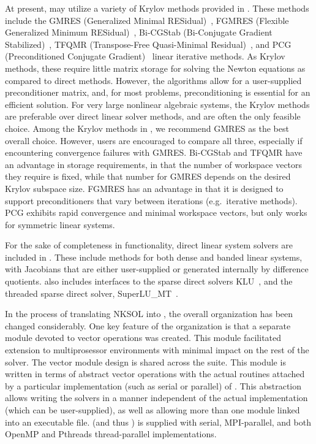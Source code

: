 At present, {\kinsol} may utilize a variety of Krylov methods provided
in {\sundials}. These methods include the
GMRES (Generalized Minimal RESidual)~\cite{SaSc:86},
FGMRES (Flexible Generalized Minimum RESidual)~\cite{Saa:93},
Bi-CGStab (Bi-Conjugate Gradient Stabilized)~\cite{Van:92}, TFQMR
(Transpose-Free Quasi-Minimal Residual)~\cite{Fre:93}, and PCG
(Preconditioned Conjugate Gradient)~\cite{HeSt:52} linear iterative
methods.  As Krylov methods, these require little
matrix storage for solving the Newton equations as compared to direct
methods. However, the algorithms allow for a user-supplied preconditioner
matrix, and, for most problems, preconditioning is essential for an
efficient solution.  For very large nonlinear algebraic systems,
the Krylov methods are preferable over direct linear solver methods,
and are often the only feasible choice. Among the Krylov
methods in {\sundials}, we recommend GMRES as the best overall
choice. However, users are encouraged to compare all three,
especially if encountering convergence failures with GMRES.
Bi-CGStab and TFQMR have an advantage in storage requirements,
in that the number of workspace vectors they require is fixed,
while that number for GMRES depends on the desired Krylov
subspace size.   FGMRES
has an advantage in that it is designed to support preconditioners
that vary between iterations (e.g.~iterative methods).  PCG exhibits
rapid convergence and minimal workspace vectors, but only works for
symmetric linear systems.

For the sake of completeness in functionality, direct linear
system solvers are included in {\kinsol}.  These include methods
for both dense and banded linear systems, with Jacobians that
are either user-supplied or generated internally by difference
quotients.  {\kinsol} also includes interfaces to the sparse
direct solvers KLU~\cite{DaPa:10,KLU_site},
and the threaded sparse direct solver,
SuperLU\_MT~\cite{Li:05,DGL:99,SuperLUMT_site}.

In the process of translating NKSOL into {\CC}, the overall
{\kinsol} organization has been changed considerably. One key
feature of the {\kinsol} organization is that a separate module
devoted to vector operations was created.  This module
facilitated extension to multiprosessor environments with minimal
impact on the rest of the solver. The vector module design is
shared across the {\sundials} suite. This {\nvector} module is
written in terms of abstract vector operations with the actual
routines attached by a particular implementation (such as serial
or parallel) of {\nvector}. This abstraction allows writing the {\sundials}
solvers in a manner independent of the actual {\nvector}
implementation (which can be user-supplied), as well as allowing
more than one {\nvector} module linked into an executable file.
{\sundials} (and thus {\kinsol}) is supplied with serial,
MPI-parallel, and both OpenMP and Pthreads thread-parallel
{\nvector} implementations.

